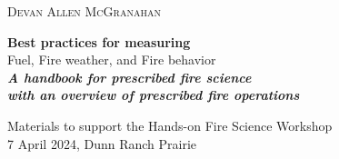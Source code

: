 	\raggedleft %
	
	\vspace*{\baselineskip} %
	
	
	\textsc{{\Large Devan Allen McGranahan}} %
	
	\vspace*{0.167\textheight} %
	
	
	\textbf{\LARGE Best practices for measuring} \\ 
	[\baselineskip] %
	
	{\textcolor{BisonGreen}{\Huge Fuel, Fire weather, and Fire behavior}}\\[\baselineskip] %
	
\textit{\textbf{\LARGE A handbook for prescribed fire science\\with an overview of prescribed fire operations}}\\[\baselineskip] %
\vspace*{1cm} %
	
	{\Large Materials to support the Hands-on Fire Science Workshop \\
	7 April 2024, Dunn Ranch Prairie} 
\vfill
\vspace*{2cm} %

\vfill 

	
	
	{\plogo }%
	
\vspace*{1\baselineskip} %
